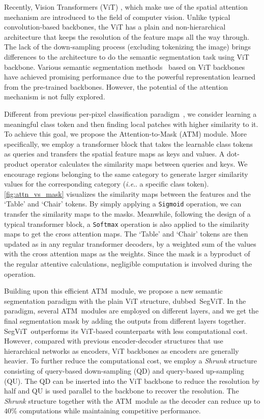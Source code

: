 \documentclass{article}
\makeatletter
\DeclareRobustCommand\onedot{\futurelet\@let@token\@onedot}
\def\@onedot{\ifx\@let@token.\else.\null\fi\xspace}
\def\ie{\emph{i.e}\onedot}
\def\atm{ATM}
\def\seg{SegViT}
\makeatother
\begin{document}
Recently, Vision Transformers (ViT) \cite{vit},
which make use of the spatial attention mechanism are introduced to the field of computer vision.
Unlike typical convolution-based backbones, the ViT has a plain and non-hierarchical architecture that keeps the resolution of the feature maps all the way through.
The lack of the down-sampling process (excluding tokenizing the image) brings differences to the architecture to do the semantic segmentation task using ViT backbone. 
Various semantic segmentation methods~\cite{setr,DPT,strudel2021segmenter} based on ViT backbones have achieved promising performance due to the powerful representation learned from the pre-trained backbones. However, the potential of the attention mechanism is not fully explored.

Different from previous per-pixel classification paradigm~\cite{setr,DPT,strudel2021segmenter}, we consider learning a meaningful  class token and then finding local patches with higher similarity to it. To achieve this goal, we propose the Attention-to-Mask (\atm) module. More specifically, we employ a transformer block that takes the learnable class tokens as queries and transfers the spatial feature maps as keys and values. A dot-product operator calculates the similarity maps between queries and keys. We encourage regions belonging to the same category to generate larger similarity values for the corresponding category (\ie a specific class token). \cref{fig:attn_vs_mask} visualizes the similarity maps between the features and the `Table' and `Chair' tokens. By simply applying a {\tt Sigmoid} operation, we can transfer the similarity maps to the masks. Meanwhile, following the design of a typical transformer block, a {\tt Softmax} operation is also applied to the similarity maps to get the cross attention maps.
The `Table' and `Chair' tokens are then updated as in any regular transformer decoders, by a weighted sum of the values with the cross attention maps as the weights.
Since the mask is a byproduct of the regular attentive calculations, negligible computation is involved during the operation.

Building upon this efficient \atm~module, we propose a new semantic segmentation paradigm with the plain ViT structure, dubbed~\seg.
In the paradigm, several \atm~modules are employed on different layers, and we get the final segmentation mask by adding the outputs from different layers together. \seg\ outperforms its ViT-based counterparts with less computational cost. However, compared with previous encoder-decoder structures that use hierarchical networks as encoders, ViT backbones as encoders are generally heavier. 
To further reduce the computational cost, we employ a \emph{Shrunk} structure consisting of query-based down-sampling (QD) and query-based up-sampling (QU). The QD can be inserted into the ViT backbone to reduce the resolution by half and QU is used parallel to the backbone to recover the resolution. The \emph{Shrunk} structure together with the \atm~module as the decoder can reduce up to $40\%$ computations while maintaining competitive performance.
\end{document}
